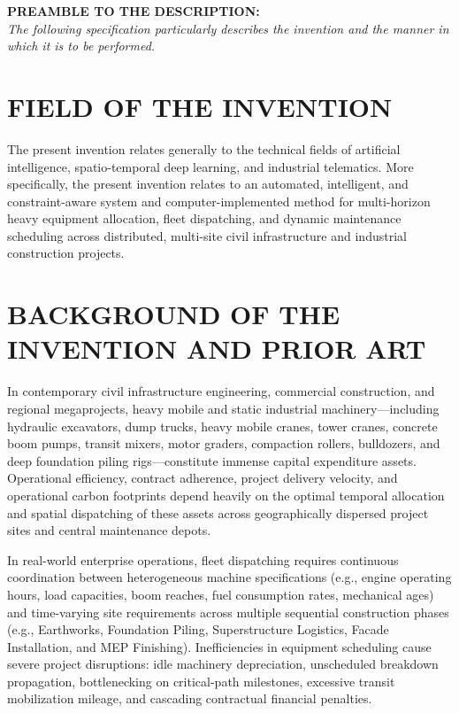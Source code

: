 \documentclass[11pt,a4paper]{article}
\begin{document}
\vspace{1em}
\textbf{PREAMBLE TO THE DESCRIPTION:}\\
\textit{The following specification particularly describes the invention and the manner in which it is to be performed.}

\newpage


\section{FIELD OF THE INVENTION}
\noindent The present invention relates generally to the technical fields of artificial intelligence, spatio-temporal deep learning, and industrial telematics. More specifically, the present invention relates to an automated, intelligent, and constraint-aware system and computer-implemented method for multi-horizon heavy equipment allocation, fleet dispatching, and dynamic maintenance scheduling across distributed, multi-site civil infrastructure and industrial construction projects.

\section{BACKGROUND OF THE INVENTION AND PRIOR ART}
\noindent In contemporary civil infrastructure engineering, commercial construction, and regional megaprojects, heavy mobile and static industrial machinery---including hydraulic excavators, dump trucks, heavy mobile cranes, tower cranes, concrete boom pumps, transit mixers, motor graders, compaction rollers, bulldozers, and deep foundation piling rigs---constitute immense capital expenditure assets. Operational efficiency, contract adherence, project delivery velocity, and operational carbon footprints depend heavily on the optimal temporal allocation and spatial dispatching of these assets across geographically dispersed project sites and central maintenance depots.

\noindent In real-world enterprise operations, fleet dispatching requires continuous coordination between heterogeneous machine specifications (e.g., engine operating hours, load capacities, boom reaches, fuel consumption rates, mechanical ages) and time-varying site requirements across multiple sequential construction phases (e.g., Earthworks, Foundation Piling, Superstructure Logistics, Facade Installation, and MEP Finishing). Inefficiencies in equipment scheduling cause severe project disruptions: idle machinery depreciation, unscheduled breakdown propagation, bottlenecking on critical-path milestones, excessive transit mobilization mileage, and cascading contractual financial penalties.
\end{document}
